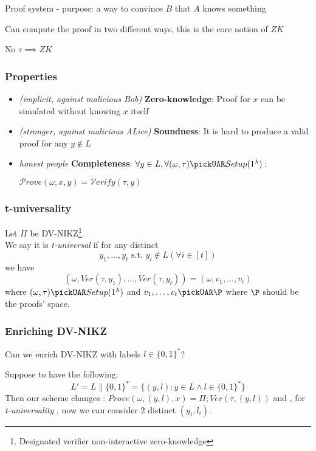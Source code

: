 Proof system - purpose: a way to convince $B$ that $A$ knows something

Can compute the proof in two different ways, this is the core notion of $ZK$

No $\tau \implies ZK$

\subsubsection{Properties}

\begin{itemize}
    \item \textit{(implicit, against malicious Bob)} \textbf{Zero-knowledge}: Proof for $x$ can be simulated without knowing $x$ itself
    \item \textit{(stronger, against malicious ALice)} \textbf{Soundness}: It is hard to produce a valid proof for any $y \notin L$
    \item \textit{honest people} \textbf{Completeness}: $\forall y \in L, \forall (\omega, \tau) \pickUAR \mathcal{S}etup(1^\lambda):$
    
    $\mathcal{P}rove(\omega, x, y) = \mathcal{V}erify(\tau, y)$
\end{itemize}


\subsubsection{t-universality}
\begin{definition}
    Let $\Pi$ be DV-NIKZ\footnote{Designated verifier non-interactive
    zero-knowledge}.\\
We say it is \textit{t-universal} if for any distinct 
\[
    y_{1}, \ldots, y_{t} \text{ s.t. } y_{i}\not\in L ( \forall i \in [t])
\]
we have 
\[
    ( \omega, Ver(\tau, y_{1}), \ldots, Ver(\tau, y_{t}))=(\omega, v_{1},
    \ldots, v_{t})
\]
where $(\omega, \tau) \pickUAR Setup(1^{\lambda})$ and $v_{1}, \ldots, v_{t}
\pickUAR \P$ where $\P$ should be the proofs' space.
\end{definition}

\subsubsection{Enriching DV-NIKZ}
Can we enrich DV-NIKZ with labels $l \in \{0,1\}^{*}$?

Suppose to have the following:
\[
    L'=L \| \{0,1\}^{*}=\{(y,l): y \in L \wedge l \in \{0,1\}^{*}\}
\]
Then our scheme changes :
$Prove(\omega, (y,l), x)=\Pi; Ver(\tau, (y, l)) $
and , for \textit{t-universality} , now we can consider 2 distinct $(y_{i},
l_{i})$.
